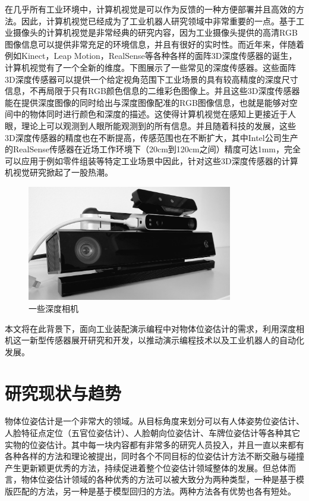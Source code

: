 在几乎所有工业环境中，计算机视觉是可以作为反馈的一种方便部署并且高效的方法。因此，计算机视觉已经成为了工业机器人研究领域中非常重要的一点。基于工业摄像头的计算机视觉是非常经典的研究内容，因为工业摄像头提供的高清RGB图像信息可以提供非常充足的环境信息，并且有很好的实时性。而近年来，伴随着例如Kinect，Leap Motion，RealSense等各种各样的面阵3D深度传感器的诞生，计算机视觉有了一个全新的维度。下图展示了一些常见的深度传感器。这些面阵3D深度传感器可以提供一个给定视角范围下工业场景的具有较高精度的深度尺寸信息，不再局限于只有RGB颜色信息的二维彩色图像上。并且这些3D深度传感器能在提供深度图像的同时给出与深度图像配准的RGB图像信息，也就是能够对空间中的物体同时进行颜色和深度的描述。这使得计算机视觉在感知上更接近于人眼，理论上可以观测到人眼所能观测到的所有信息。并且随着科技的发展，这些3D深度传感器的精度也在不断提高，传感范围也在不断扩大，其中Intel公司生产的RealSense传感器在近场工作环境下（20cm到120cm之间）精度可达1mm，完全可以应用于例如零件组装等特定工业场景中因此，针对这些3D深度传感器的计算机视觉研究掀起了一股热潮。

\begin{figure}[htb]
	\centering 
	\includegraphics[width=0.8\textwidth]{./mypic/一些深度相机.jpg} 
	\caption{一些深度相机} 
\end{figure}


本文将在此背景下，面向工业装配演示编程中对物体位姿估计的需求，利用深度相机这一新型传感器展开研究和开发，以推动演示编程技术以及工业机器人的自动化发展。


\section{研究现状与趋势} 

物体位姿估计是一个非常大的领域。从目标角度来划分可以有人体姿势位姿估计、人脸特征点定位（五官位姿估计）、人脸朝向位姿估计、车牌位姿估计等各种其它实物的位姿估计。其中每一块内容都有非常多的研究人员投入，并且一直以来都有各种各样的方法和理论被提出，同时各个不同目标的位姿估计方法不断交融与碰撞产生更新颖更优秀的方法，持续促进着整个位姿估计领域整体的发展。但总体而言，物体位姿估计领域的各种优秀的方法可以被大致分为两种类型，一种是基于模版匹配的方法，另一种是基于模型回归的方法。两种方法各有优势也各有短处。


